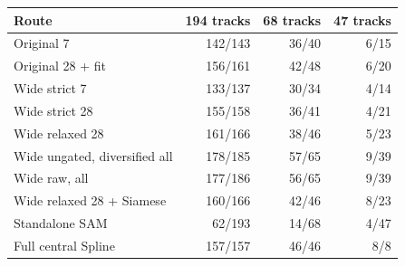\begin{tabular}{lrrr}
\toprule
Route & 194 tracks & 68 tracks & 47 tracks \\
\midrule
Original 7 & 142/143 & 36/40 & 6/15 \\
Original 28 + fit & 156/161 & 42/48 & 6/20 \\
Wide strict 7 & 133/137 & 30/34 & 4/14 \\
Wide strict 28 & 155/158 & 36/41 & 4/21 \\
Wide relaxed 28 & 161/166 & 38/46 & 5/23 \\
Wide ungated, diversified all & 178/185 & 57/65 & 9/39 \\
Wide raw, all & 177/186 & 56/65 & 9/39 \\
Wide relaxed 28 + Siamese & 160/166 & 42/46 & 8/23 \\
Standalone SAM & 62/193 & 14/68 & 4/47 \\
Full central Spline & 157/157 & 46/46 & 8/8 \\
\bottomrule
\end{tabular}
